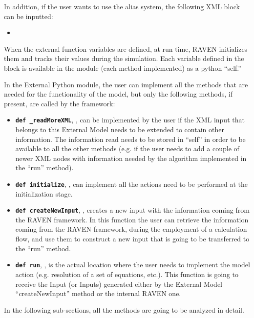 In addition, if the user wants to use the alias system, the following XML block can be inputted:
\begin{itemize}
  \item {}
\end{itemize}


When the external function variables are defined, at run time, RAVEN initializes
them and tracks their values during the simulation.
%
Each variable defined in the  block is available in the
module (each method implemented) as a python ``self.''
%

In the External Python module, the user can implement all the methods that are
needed for the functionality of the model, but only the following methods, if
present, are called by the framework:
\begin{itemize}
  \item \texttt{\textbf{def \_readMoreXML}}, , can be
  implemented by the user if the XML input that belongs to this External Model
  needs to be extended to contain other information.
  The information read needs to be stored in ``self'' in order to be available
  to all the other methods (e.g. if the user needs to add a couple of newer XML
  nodes with information needed by the algorithm implemented in the ``run''
  method).
  \item \texttt{\textbf{def initialize}}, , can
  implement all the actions need to be performed at the initialization stage.
  \item \texttt{\textbf{def createNewInput}}, , creates
  a new input with the information coming from the RAVEN framework.
  In this function the user can retrieve the information coming from the RAVEN
  framework, during the employment of a calculation flow, and use them to
  construct a new input that is going to be transferred to the ``run'' method.
  \item \texttt{\textbf{def run}}, , is the actual
  location where the user needs to implement the model action (e.g. resolution
  of a set of equations, etc.).
  This function is going to receive the Input (or Inputs) generated either by
  the External Model ``createNewInput'' method or the internal RAVEN one.
\end{itemize}

In the following sub-sections, all the methods are going to be analyzed in
detail.

